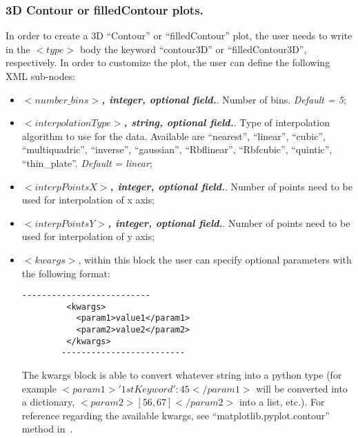 \subsubsection{3D Contour or filledContour plots.}
In order to create a 3D ``Contour'' or ``filledContour'' plot, the user needs to write in the $<type>$ body the keyword ``contour3D'' or ``filledContour3D'', respectively. In order to customize the plot, the user can define the following XML sub-nodes:
  \begin{itemize}
   \item $<number\_bins>$\textbf{\textit{, integer, optional  field.}}. Number of bins. \textit{Default = 5};
     \item $<interpolationType>$\textbf{\textit{, string, optional  field.}}. Type of interpolation algorithm to use for the data. Available are ``nearest'', ``linear'', ``cubic'', ``multiquadric'', ``inverse'', ``gaussian'', ``Rbflinear'', ``Rbfcubic'', ``quintic'', ``thin\_plate''. \textit{Default = linear};
     \item $<interpPointsX>$\textbf{\textit{, integer, optional  field.}}. Number of points need to be used for interpolation of x axis;
     \item $<interpPointsY>$\textbf{\textit{, integer, optional  field.}}. Number of points need to be used for interpolation of y axis;
 \item \textit{$<kwargs>$},  within this block the user can specify optional parameters with the following format:
        \begin{lstlisting}[style=XML]
        --------------------------
         <kwargs>
           <param1>value1</param1>
           <param2>value2</param2>
         </kwargs>
        -------------------------
       \end{lstlisting}
         The kwargs block is able to convert whatever string into a python type (for example $<param1>{'1stKeyword':45}</param1>$ will be converted into a dictionary, $<param2>[56,67]</param2>$ into a list, etc.). For reference regarding the available kwargs, see ``matplotlib.pyplot.contour'' method in~\cite{MatPlotLib}.
    \end{itemize}


